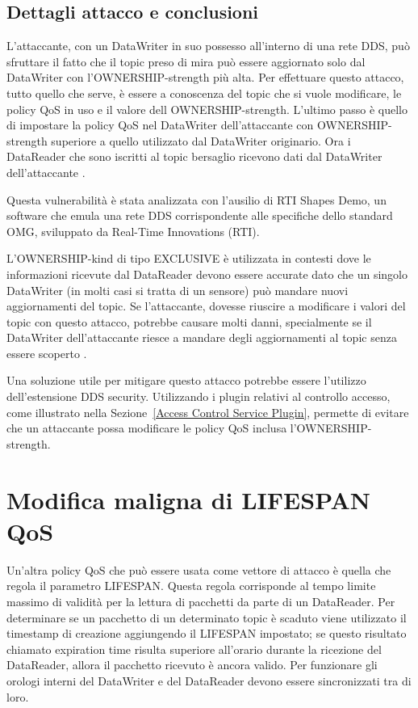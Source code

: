 \subsection{Dettagli attacco e conclusioni}
L'attaccante, con un DataWriter in suo possesso all'interno di una rete DDS,
può sfruttare il fatto che il topic preso di mira può essere aggiornato
solo dal DataWriter con l'OWNERSHIP-strength più alta.
Per effettuare questo attacco, tutto quello che serve, è 
essere a conoscenza del topic che
si vuole modificare, le policy QoS in uso e il valore dell OWNERSHIP-strength.
L'ultimo passo è quello di impostare la policy QoS nel DataWriter
dell'attaccante con OWNERSHIP-strength superiore a quello utilizzato dal
DataWriter originario.
Ora i DataReader che sono iscritti al topic bersaglio
ricevono dati dal DataWriter dell'attaccante
\cite{DBLP:conf/malware/MichaudDL18}.


Questa vulnerabilità è stata analizzata con l'ausilio di RTI Shapes Demo, un 
software che emula una rete DDS corrispondente alle specifiche 
dello standard OMG, sviluppato da Real-Time Innovations (RTI).

L'OWNERSHIP-kind di tipo EXCLUSIVE è utilizzata in contesti dove le
informazioni ricevute dal DataReader devono essere accurate dato che un singolo
DataWriter (in molti casi si tratta di un sensore) può mandare nuovi aggiornamenti
del topic. Se l'attaccante, dovesse riuscire a modificare i valori del topic con
questo attacco, potrebbe causare molti danni,
specialmente se il DataWriter dell'attaccante riesce a mandare degli aggiornamenti
al topic senza essere scoperto
\cite{DBLP:conf/malware/MichaudDL18}.

Una soluzione utile per mitigare questo attacco potrebbe essere l'utilizzo
dell'estensione DDS security. Utilizzando i plugin relativi al controllo accesso,
come illustrato nella Sezione~\ref{Access Control Service Plugin}, permette
di evitare che un attaccante possa modificare le policy QoS inclusa 
l'OWNERSHIP-strength.


\section{Modifica maligna di LIFESPAN QoS}

Un'altra policy QoS che può essere usata come vettore di attacco è quella
che regola il parametro LIFESPAN. Questa regola corrisponde al tempo limite massimo 
di validità per la
lettura di pacchetti da parte di un DataReader. Per determinare se un pacchetto
di un determinato topic è scaduto viene utilizzato il timestamp di creazione
aggiungendo il LIFESPAN impostato; se questo risultato chiamato 
expiration time risulta
superiore all'orario durante la ricezione del DataReader, allora il pacchetto
ricevuto è ancora valido. 
Per funzionare gli orologi interni del DataWriter e del DataReader
devono essere sincronizzati tra di loro.

